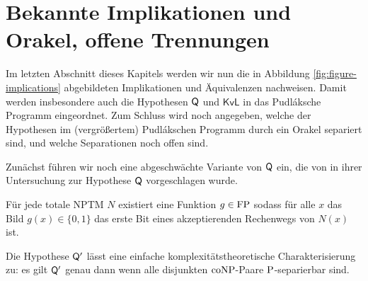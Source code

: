 \section{Bekannte Implikationen und Orakel, offene Trennungen}\label{sec:pudlak-overview}

Im letzten Abschnitt dieses Kapitels werden wir nun die in Abbildung \ref{fig:figure-implications} abgebildeten Implikationen und Äquivalenzen nachweisen.
Damit werden insbesondere auch die Hypothesen $\hQ$ und $\mathsf{KvL}$ in das Pudláksche Programm eingeordnet.
Zum Schluss wird noch angegeben, welche der Hypothesen im (vergrößertem) Pudlákschen Programm durch ein Orakel separiert sind, und welche Separationen noch offen sind.

Zunächst führen wir noch eine abgeschwächte Variante von $\hQ$ ein, die von \textcite{fenner_inverting_2003} in ihrer Untersuchung zur Hypothese $\hQ$ vorgeschlagen wurde.

\begin{conjecture}
    Für jede totale NPTM $N$ existiert eine Funktion $g\in\FP$ sodass für alle $x$ das Bild $g(x)\in\{0,1\}$ das erste Bit eines akzeptierenden Rechenwegs von $N(x)$ ist. 
\end{conjecture}
Die Hypothese $\hQ'$ lässt eine einfache komplexitätstheoretische Charakterisierung zu: es gilt $\hQ'$ genau dann wenn alle disjunkten $\coNP$-Paare $\P$-separierbar sind.

